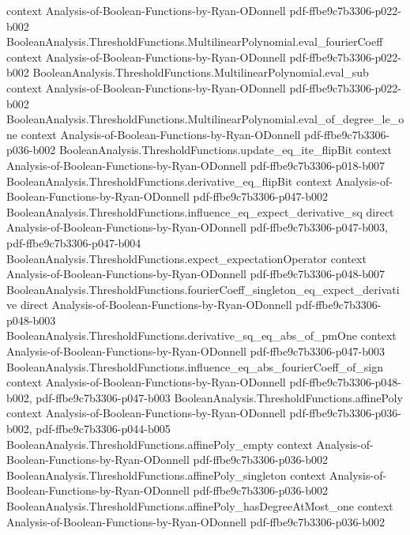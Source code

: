 \begin{theorem}
  {context}
  {Analysis-of-Boolean-Functions-by-Ryan-ODonnell}
  {pdf-ffbe9c7b3306-p022-b002}
\proofstep
  {BooleanAnalysis.ThresholdFunctions.MultilinearPolynomial.eval_fourierCoeff}
  {context}
  {Analysis-of-Boolean-Functions-by-Ryan-ODonnell}
  {pdf-ffbe9c7b3306-p022-b002}
\proofstep
  {BooleanAnalysis.ThresholdFunctions.MultilinearPolynomial.eval_sub}
  {context}
  {Analysis-of-Boolean-Functions-by-Ryan-ODonnell}
  {pdf-ffbe9c7b3306-p022-b002}
\proofstep
  {BooleanAnalysis.ThresholdFunctions.MultilinearPolynomial.eval_of_degree_le_one}
  {context}
  {Analysis-of-Boolean-Functions-by-Ryan-ODonnell}
  {pdf-ffbe9c7b3306-p036-b002}
\proofstep
  {BooleanAnalysis.ThresholdFunctions.update_eq_ite_flipBit}
  {context}
  {Analysis-of-Boolean-Functions-by-Ryan-ODonnell}
  {pdf-ffbe9c7b3306-p018-b007}
\proofstep
  {BooleanAnalysis.ThresholdFunctions.derivative_eq_flipBit}
  {context}
  {Analysis-of-Boolean-Functions-by-Ryan-ODonnell}
  {pdf-ffbe9c7b3306-p047-b002}
\proofstep
  {BooleanAnalysis.ThresholdFunctions.influence_eq_expect_derivative_sq}
  {direct}
  {Analysis-of-Boolean-Functions-by-Ryan-ODonnell}
  {pdf-ffbe9c7b3306-p047-b003,
    pdf-ffbe9c7b3306-p047-b004}
\proofstep
  {BooleanAnalysis.ThresholdFunctions.expect_expectationOperator}
  {context}
  {Analysis-of-Boolean-Functions-by-Ryan-ODonnell}
  {pdf-ffbe9c7b3306-p048-b007}
\proofstep
  {BooleanAnalysis.ThresholdFunctions.fourierCoeff_singleton_eq_expect_derivative}
  {direct}
  {Analysis-of-Boolean-Functions-by-Ryan-ODonnell}
  {pdf-ffbe9c7b3306-p048-b003}
\proofstep
  {BooleanAnalysis.ThresholdFunctions.derivative_sq_eq_abs_of_pmOne}
  {context}
  {Analysis-of-Boolean-Functions-by-Ryan-ODonnell}
  {pdf-ffbe9c7b3306-p047-b003}
\proofstep
  {BooleanAnalysis.ThresholdFunctions.influence_eq_abs_fourierCoeff_of_sign}
  {context}
  {Analysis-of-Boolean-Functions-by-Ryan-ODonnell}
  {pdf-ffbe9c7b3306-p048-b002,
    pdf-ffbe9c7b3306-p047-b003}
\proofstep
  {BooleanAnalysis.ThresholdFunctions.affinePoly}
  {context}
  {Analysis-of-Boolean-Functions-by-Ryan-ODonnell}
  {pdf-ffbe9c7b3306-p036-b002,
    pdf-ffbe9c7b3306-p044-b005}
\proofstep
  {BooleanAnalysis.ThresholdFunctions.affinePoly_empty}
  {context}
  {Analysis-of-Boolean-Functions-by-Ryan-ODonnell}
  {pdf-ffbe9c7b3306-p036-b002}
\proofstep
  {BooleanAnalysis.ThresholdFunctions.affinePoly_singleton}
  {context}
  {Analysis-of-Boolean-Functions-by-Ryan-ODonnell}
  {pdf-ffbe9c7b3306-p036-b002}
\proofstep
  {BooleanAnalysis.ThresholdFunctions.affinePoly_hasDegreeAtMost_one}
  {context}
  {Analysis-of-Boolean-Functions-by-Ryan-ODonnell}
  {pdf-ffbe9c7b3306-p036-b002}

\end{theorem}
